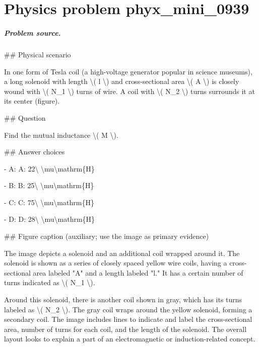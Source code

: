 
\chapter{Physics problem phyx\_mini\_0939}
\label{ch:PhyXMiniProblems_problem_phyx_mini_0939}

\paragraph{Problem source.}
\#\# Physical scenario

In one form of Tesla coil (a high-voltage generator popular in science museums), a long solenoid with length \textbackslash{}( l \textbackslash{}) and cross-sectional area \textbackslash{}( A \textbackslash{}) is closely wound with \textbackslash{}( N\_1 \textbackslash{}) turns of wire. A coil with \textbackslash{}( N\_2 \textbackslash{}) turns surrounds it at its center (figure).

\#\# Question

Find the mutual inductance \textbackslash{}( M \textbackslash{}).

\#\# Answer choices

- A: A: 22\textbackslash{} \textbackslash{}mu\textbackslash{}mathrm\{H\}

- B: B: 25\textbackslash{} \textbackslash{}mu\textbackslash{}mathrm\{H\}

- C: C: 75\textbackslash{} \textbackslash{}mu\textbackslash{}mathrm\{H\}

- D: D: 28\textbackslash{} \textbackslash{}mu\textbackslash{}mathrm\{H\}

\#\# Figure caption (auxiliary; use the image as primary evidence)

The image depicts a solenoid and an additional coil wrapped around it. The solenoid is shown as a series of closely spaced yellow wire coils, having a cross-sectional area labeled "A" and a length labeled "l." It has a certain number of turns indicated as \textbackslash{}( N\_1 \textbackslash{}).

Around this solenoid, there is another coil shown in gray, which has its turns labeled as \textbackslash{}( N\_2 \textbackslash{}). The gray coil wraps around the yellow solenoid, forming a secondary coil. The image includes lines to indicate and label the cross-sectional area, number of turns for each coil, and the length of the solenoid. The overall layout looks to explain a part of an electromagnetic or induction-related concept.

